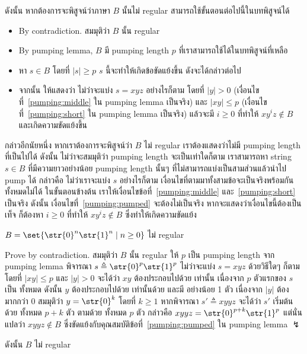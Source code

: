 ดังนั้น หากต้องการจะพิสูจน์ว่าภาษา $B$ นั้นไม่ regular สามารถใช้ขั้นตอนต่อไปนี้ในบทพิสูจน์ได้
\begin{itemize}
\item By contradiction.  สมมุติว่า $B$ นั้น regular
\item By pumping lemma, $B$ มี pumping length $p$ ที่เราสามารถใช้ได้ในบทพิสูจน์ที่เหลือ
\item หา $s\in B$ โดยที่ $|s|\geq p$ \enskip $s$ นี้จะทำให้เกิดข้อขัดแย้งขึ้น ดังจะได้กล่าวต่อไป
\item จากนั้น ให้แสดงว่า ไม่ว่าจะแบ่ง $s=xyz$ อย่างไรก็ตาม โดยที่ $|y|>0$ (เงื่อนไขที่~\ref{pumping:middle} ใน pumping lemma เป็นจริง) และ $|xy|\leq p$ (เงื่อนไขที่~\ref{pumping:short} ใน pumping lemma เป็นจริง) แล้วจะมี $i\geq 0$ ที่ทำให้ $xy^iz\notin B$ และเกิดความขัดแย้งขึ้น
\end{itemize}
กล่าวอีกนัยหนึ่ง หากเราต้องการจะพิสูจน์ว่า $B$ ไม่ regular เราต้องแสดงว่าไม่มี pumping length ที่เป็นไปได้ \enskip ดังนั้น ไม่ว่าจะสมมุติว่า pumping length จะเป็นเท่าใดก็ตาม เราสามารถหา string $s\in B$ ที่มีความยาวอย่างน้อย pumping length นั้นๆ ที่ไม่สามารถแบ่งเป็นสามส่วนแล้วนำไป pump ได้ กล่าวคือ ไม่ว่าเราจะแบ่ง $s$ อย่างไรก็ตาม เงื่อนไขที่ตามมาทั้งสามข้อจะเป็นจริงพร้อมกันทั้งหมดไม่ได้ \enskip ในขั้นตอนข้างต้น เราให้เงื่อนไขข้อที่~\ref{pumping:middle} และ~\ref{pumping:short} เป็นจริง ดังนั้น เงื่อนไขที่~\ref{pumping:pumped} จะต้องไม่เป็นจริง \enskip หากจะแสดงว่าเงื่อนไขนี้ต้องเป็นเท็จ ก็ต้องหา $i\geq 0$ ที่ทำให้ $xy^iz\notin B$ ซึ่งทำให้เกิดความขัดแย้ง

\begin{example}\label{ex:0n1n-nonreg}
$B=\set{\str{0}^n\str{1}^n\mid n\geq 0}$ ไม่ regular

Prove by contradiction.  สมมุติว่า $B$ นั้น regular \enskip ให้ $p$ เป็น pumping length จาก pumping lemma \enskip พิจารณา $s\triangleq\str{0}^p\str{1}^p$ \enskip ไม่ว่าจะแบ่ง $s=xyz$ ด้วยวิธีใดๆ ก็ตาม โดยที่ $|xy|\leq p$ และ $|y|>0$ จะได้ว่า $xy$ ต้องประกอบไปด้วย  เท่านั้น เนื่องจาก $p$ ตัวแรกของ $s$ เป็น  ทั้งหมด \enskip ดังนั้น $y$ ต้องประกอบไปด้วย  เท่านั้นด้วย และมี  อย่างน้อย 1 ตัว เนื่องจาก $|y|$ ต้องมากกว่า 0 \enskip สมมุติว่า $y=\str{0}^k$ โดยที่ $k\geq 1$ \enskip หากพิจารณา $s'\triangleq xyyz$ จะได้ว่า $s'$ เริ่มต้นด้วย  ทั้งหมด $p+k$ ตัว ตามด้วย  ทั้งหมด $p$ ตัว กล่าวคือ $xyyz=\str{0}^{p+k}\str{1}^p$ \enskip แต่นั่นแปลว่า $xyyz\notin B$ ซึ่งขัดแย้งกับคุณสมบัติข้อที่~\ref{pumping:pumped} ใน pumping lemma $\lightning$

ดังนั้น $B$ ไม่ regular
\end{example}

